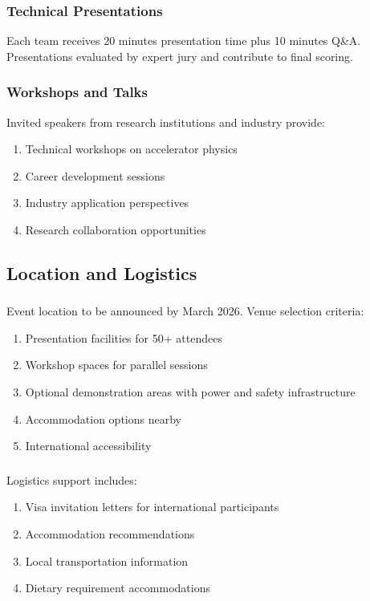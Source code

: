 \subsubsection{Technical Presentations}
Each team receives 20 minutes presentation time plus 10 minutes Q\&A. Presentations evaluated by expert jury and contribute to final scoring.

\subsubsection{Workshops and Talks}
Invited speakers from research institutions and industry provide:
\begin{enumerate}[noitemsep]
    \item Technical workshops on accelerator physics
    \item Career development sessions
    \item Industry application perspectives
    \item Research collaboration opportunities
\end{enumerate}

\subsection{Location and Logistics}

\subsubsection{}
Event location to be announced by March 2026. Venue selection criteria:
\begin{enumerate}[noitemsep]
    \item Presentation facilities for 50+ attendees
    \item Workshop spaces for parallel sessions
    \item Optional demonstration areas with power and safety infrastructure
    \item Accommodation options nearby
    \item International accessibility
\end{enumerate}

\subsubsection{}
Logistics support includes:
\begin{enumerate}[noitemsep]
    \item Visa invitation letters for international participants
    \item Accommodation recommendations
    \item Local transportation information
    \item Dietary requirement accommodations
\end{enumerate}

